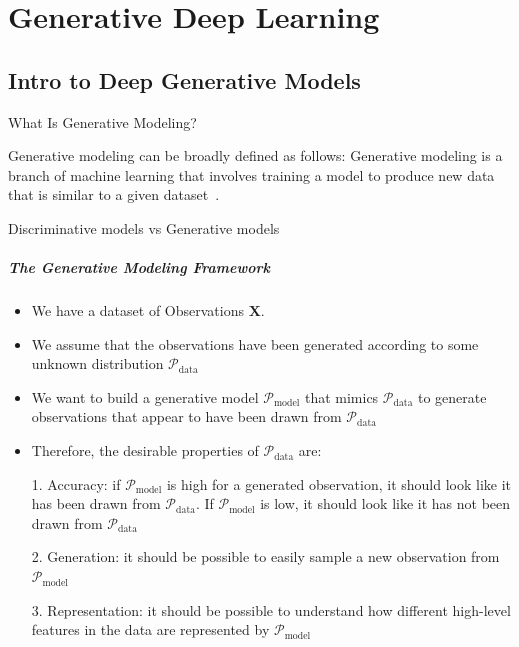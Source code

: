 \chapter{Generative Deep Learning}\label{chp:generative_deep_learning}

\section{Intro to Deep Generative Models}

What Is Generative Modeling?

Generative modeling can be broadly defined as follows:
Generative modeling is a branch of machine learning that involves training a model to produce new data that is similar to a given dataset~\cite{foster2022generative}.

Discriminative models vs Generative models

\paragraph{The Generative Modeling Framework}

\begin{itemize}
	\item We have a dataset of Observations $\mathbf{X}$. \item We assume that the observations have been generated according to some unknown distribution \(\mathcal{P}_{\textrm{data}}\)
	\item We want to build a generative model \(\mathcal{P}_{\textrm{model}}\) that mimics \(\mathcal{P}_{\textrm{data}}\) to generate observations that appear to have been drawn from \(\mathcal{P}_{\textrm{data}}\)
	\item Therefore, the desirable properties of \(\mathcal{P}_{\textrm{data}}\) are:

	      1. Accuracy: if \(\mathcal{P}_{\textrm{model}}\)  is high for a generated observation, it should look like it has been drawn from \(\mathcal{P}_{\textrm{data}}\). If \(\mathcal{P}_{\textrm{model}}\) is low, it should look like it has not been drawn from \(\mathcal{P}_{\textrm{data}}\)

	      2. Generation: it should be possible  to easily sample a new observation from \(\mathcal{P}_{\textrm{model}}\)

	      3. Representation:  it should be possible to understand how different high-level features in the data are represented by \(\mathcal{P}_{\textrm{model}}\)
\end{itemize}


